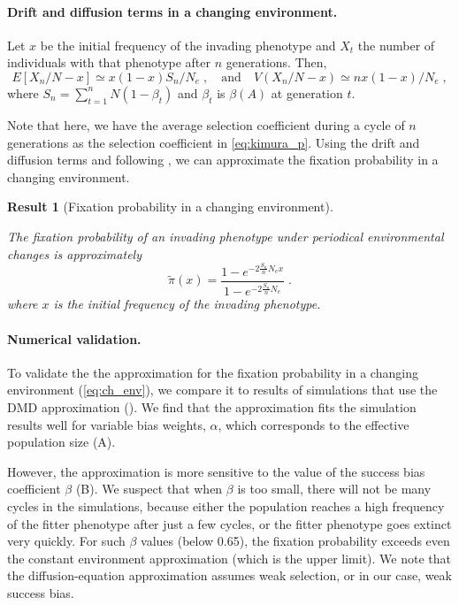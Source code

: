 \documentclass[12pt]{extarticle}
\newtheorem{result}{Result}
\begin{document}
\paragraph{Drift and diffusion terms in a changing environment.}
Let $x$ be the initial frequency of the invading phenotype and $X_t$ the number of individuals with that phenotype after $n$ generations.
Then,
\begin{equation}\label{eq:ch_expected_and_var}
E[X_n/N - x] \simeq x(1-x) S_n / N_e \;, 
\quad
\text{and}
\quad
V(X_n/N-x) \simeq  n x(1-x) / N_e \;,
\end{equation}
where $S_n=\sum\limits_{t=1}^{n} N (1-\beta_t)$ and $\beta_t$ is $\beta(A)$ at generation $t$. 

Note that here, we have the average selection coefficient during a cycle of $n$ generations as the selection coefficient {in} \cref{eq:kimura_p}.
Using the drift and diffusion terms and following \citep{changeEnv}, we can approximate the fixation probability in a changing environment.
\\

\begin{result}[Fixation probability in a changing environment]\label{res:ch_expected}

The fixation probability of an invading phenotype under periodical environmental changes is approximately
\begin{equation}\label{eq:ch_env}
\tilde\pi(x) = \frac{1-e^{-2 \frac{S_n}{n} N_e x}}{1-e^{-2 \frac{S_n}{n} N_e}} \;.
\end{equation}
where $x$ is the initial frequency of the invading phenotype.
\end{result}

\paragraph{Numerical validation.}
To validate the the approximation for the fixation probability in a changing environment (\cref{eq:ch_env}), we compare it to results of simulations that use the DMD approximation ().
We find that the approximation fits the simulation results well for variable bias weights, $\alpha$, which corresponds to the effective population size (A).

However, the approximation is more sensitive to the value of the success bias coefficient $\beta$ (B).
We suspect that when $\beta$ is too small, there will not be many cycles in the simulations, because either the population reaches a high frequency of the fitter phenotype after just a few cycles, or the fitter phenotype {goes} extinct very quickly. 
For such $\beta$ values (below 0.65), the fixation probability exceeds even the constant environment approximation (which is the upper limit). We note that the diffusion-equation approximation assumes weak selection, or in our case, weak success bias.
\end{document}
